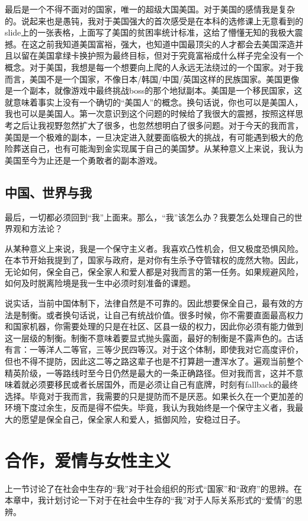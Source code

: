 \documentclass[11pt,twoside,fontset=none,scheme=plain]{ctexart}
\begin{document}
最后是一个不得不面对的国家，唯一的超级大国美国。对于美国的感情我是复杂的。说起来也是愚钝，我对于美国强大的首次感受是在本科的选修课上无意看到的slide上的一张表格，上面写了美国的贫困率统计标准，这给了懵懂无知的我极大震撼。在这之前我知道美国富裕，强大，也知道中国最顶尖的人才都会去美国深造并且以留在美国拿绿卡换护照为最终目标，但对于究竟富裕成什么样子完全没有一个概念。对于美国，我想是每一个想要向上爬的人永远无法绕过的一个国家。对于我而言，美国不是一个国家，不像日本/韩国/中国/英国这样的民族国家。美国更像是一个副本，就像游戏中最终挑战boss的那个地狱副本。美国是一个移民国家，这就意味着事实上没有一个确切的“美国人”的概念。换句话说，你也可以是美国人，我也可以是美国人。第一次意识到这个问题的时候给了我很大的震撼，按照这样思考之后让我视野忽然扩大了很多，也忽然想明白了很多问题。对于今天的我而言，美国是一个极难的副本，一旦决定进入就要面临极大的挑战，有可能遇到极大的危险葬送自己，也有可能淘到金实现属于自己的美国梦。从某种意义上来说，我认为美国至今为止还是一个勇敢者的副本游戏。

\subsection{中国、世界与我}

最后，一切都必须回到“我”上面来。那么，“我”该怎么办？我要怎么处理自己的世界观和方法论？

从某种意义上来说，我是一个保守主义者。我喜欢凸性机会，但又极度恐惧风险。在本节开始我提到了，国家与政府，是对你有生杀予夺管辖权的庞然大物。因此，无论如何，保全自己，保全家人和爱人都是对我而言的第一任务。如果规避风险，如何及时脱离险境是我一生中必须时刻准备的课题。

说实话，当前中国体制下，法律自然是不可靠的。因此想要保全自己，最有效的方法是制衡。或者换句话说，让自己有统战价值。很多时候，你不需要直面最高权力和国家机器，你需要处理的只是在社区、区县一级的权力，因此你必须有能力做到这一层级的制衡。制衡不意味着要显式抛头露面，最好的制衡是不露声色的。古话有言：一等洋人二等官，三等少民四等汉。对于这个体制，即使我对它高度评价，但也不得不提防，因此这二等之路这辈子也是不打算趟一遭浑水了。遍观当前整个精英阶级，一等路线时至今日仍然是最大的一条正确路径。但对我而言，这并不意味着就必须要移民或者长居国外，而是必须让自己有底牌，时刻有fallback的最终选择。毕竟对于我而言，我需要的只是提防而不是厌恶。如果长久在一个更加差的环境下度过余生，反而是得不偿失。毕竟，我认为我始终是一个保守主义者，我最大的愿望是保全自己，保全家人和爱人，抵御风险，安稳过日子。


\section{合作，爱情与女性主义}
上一节讨论了在社会中生存的“我”对于社会组织的形式“国家”和“政府”的思辨。在本章中，我计划讨论一下对于在社会中生存的“我”对于人际关系形式的“爱情”的思辨。
\end{document}
